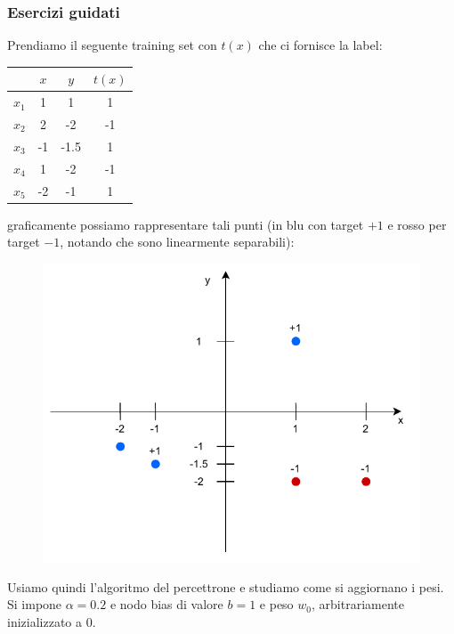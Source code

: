 					\subsubsection{Esercizi guidati}
					\begin{esercizio}
						Prendiamo il seguente training set con $t(x)$ che ci fornisce la label:
						\begin{table}[H]
							\centering
							\begin{tabular}{c||c|c|c}
								      & $x$ & $y$  & $t(x)$ \\
								\hline
								\hline
								$x_1$ & 1   & 1    & 1      \\
								$x_2$ & 2   & -2   & -1     \\
								$x_3$ & -1  & -1.5 & 1      \\
								$x_4$ & 1   & -2   & -1     \\
								$x_5$ & -2  & -1   & 1      \\
							\end{tabular}
						\end{table}
						graficamente possiamo rappresentare tali punti (in blu con target $+1$ e rosso
						per target $-1$, notando che sono linearmente separabili):
						\begin{figure}[H]
							\centering
							\includegraphics[scale = 0.8]{img/per1.pdf}
						\end{figure}
						Usiamo quindi l'algoritmo del percettrone e studiamo come si aggiornano i
						pesi. Si impone $\alpha=0.2$ e nodo bias di valore $b=1$ e peso $w_0$,
						arbitrariamente inizializzato a 0.\\ 

\end{esercizio}
